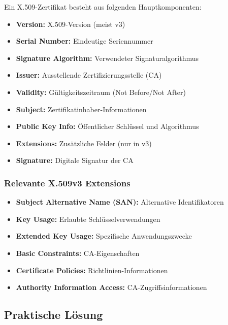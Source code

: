 \documentclass{article}
\begin{document}
Ein X.509-Zertifikat besteht aus folgenden Hauptkomponenten:

\begin{itemize}[leftmargin=1.5cm]
    \item \textbf{Version:} X.509-Version (meist v3)
    \item \textbf{Serial Number:} Eindeutige Seriennummer
    \item \textbf{Signature Algorithm:} Verwendeter Signaturalgorithmus
    \item \textbf{Issuer:} Ausstellende Zertifizierungsstelle (CA)
    \item \textbf{Validity:} Gültigkeitszeitraum (Not Before/Not After)
    \item \textbf{Subject:} Zertifikatinhaber-Informationen
    \item \textbf{Public Key Info:} Öffentlicher Schlüssel und Algorithmus
    \item \textbf{Extensions:} Zusätzliche Felder (nur in v3)
    \item \textbf{Signature:} Digitale Signatur der CA
\end{itemize}

\subsubsection{Relevante X.509v3 Extensions}

\begin{tcolorbox}[colback=thd-blue!10,colframe=thd-blue,title=\textbf{Wichtige Extensions}]
\begin{itemize}[leftmargin=1cm]
    \item \textbf{Subject Alternative Name (SAN):} Alternative Identifikatoren
    \item \textbf{Key Usage:} Erlaubte Schlüsselverwendungen
    \item \textbf{Extended Key Usage:} Spezifische Anwendungszwecke
    \item \textbf{Basic Constraints:} CA-Eigenschaften
    \item \textbf{Certificate Policies:} Richtlinien-Informationen
    \item \textbf{Authority Information Access:} CA-Zugriffsinformationen
\end{itemize}
\end{tcolorbox}

\subsection{Praktische Lösung}
\end{document}
